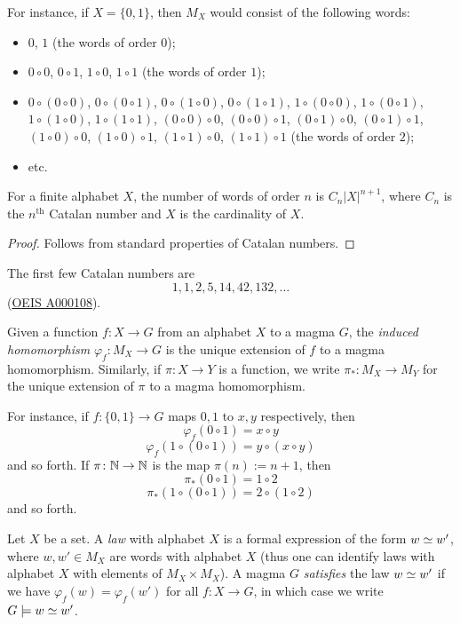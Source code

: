 For instance, if $X = \{0,1\}$, then $M_X$ would consist of the following words:
\begin{itemize}
  \item $0$, $1$ (the words of order $0$);
  \item $0 \circ 0$, $0 \circ 1$, $1 \circ 0$, $1 \circ 1$ (the words of order $1$);
  \item $0 \circ (0 \circ 0)$, $0 \circ (0 \circ 1)$, $0 \circ (1 \circ 0)$, $0 \circ (1 \circ 1)$, $1 \circ (0 \circ 0)$, $1 \circ (0 \circ 1)$, $1 \circ (1 \circ 0)$, $1 \circ (1 \circ 1)$, $(0 \circ 0) \circ 0$, $(0 \circ 0) \circ 1$, $(0 \circ 1) \circ 0$, $(0 \circ 1) \circ 1$, $(1 \circ 0) \circ 0$, $(1 \circ 0) \circ 1$, $(1 \circ 1) \circ 0$, $(1 \circ 1) \circ 1$ (the words of order $2$);
  \item etc.
\end{itemize}

\begin{lemma}  For a finite alphabet $X$, the number of words of order $n$ is $C_n |X|^{n+1}$, where $C_n$ is the $n^{\mathrm{th}}$ Catalan number and $X$ is the cardinality of $X$.
\end{lemma}

\begin{proof} Follows from standard properties of Catalan numbers.
\end{proof}

The first few Catalan numbers are
$$ 1, 1, 2, 5, 14, 42, 132, \dots$$
(\href{https://oeis.org/A000108}{OEIS A000108}).


\begin{definition}\label{induced-def}  Given a function $f: X \to G$ from an alphabet $X$ to a magma $G$, the \emph{induced homomorphism} $\varphi_f: M_X \to G$ is the unique extension of $f$ to a magma homomorphism.  Similarly, if $\pi \colon X \to Y$ is a function, we write $\pi_* \colon M_X \to M_Y$ for the unique extension of $\pi$ to a magma homomorphism.
\end{definition}

For instance, if $f : \{0,1\} \to G$ maps $0,1$ to $x,y$ respectively, then
$$ \varphi_f(0 \circ 1) = x \circ y$$
$$ \varphi_f(1 \circ (0 \circ 1)) = y \circ (x \circ y)$$
and so forth.  If $\pi \colon \mathbb{N} \to \mathbb{N}$ is the map $\pi(n) := n+1$, then
$$ \pi_*(0 \circ 1) = 1 \circ 2$$
$$ \pi_*(1 \circ (0 \circ 1)) = 2 \circ (1 \circ 2)$$
and so forth.

\begin{definition}[Law]\label{law-def}  Let $X$ be a set. A \emph{law} with alphabet $X$ is a formal expression of the form $w \simeq w'$, where $w, w' \in M_X$ are words with alphabet $X$ (thus one can identify laws with alphabet $X$ with elements of $M_X \times M_X$).  A magma $G$ \emph{satisfies} the law $w \simeq w'$ if we have $\varphi_f( w ) = \varphi_f ( w' )$ for all $f: X \to G$, in which case we write $G \models w \simeq w'$.
\end{definition}

